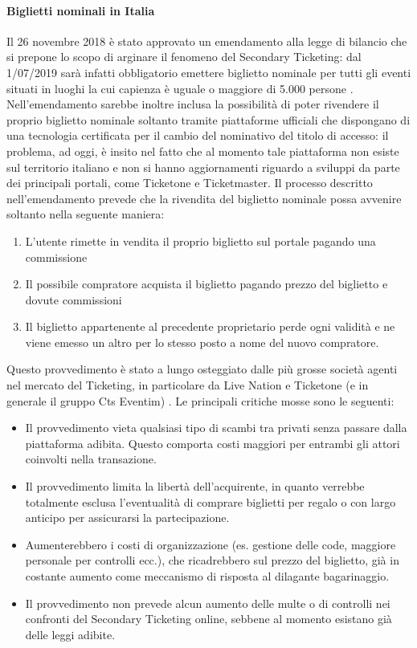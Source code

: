 \paragraph{Biglietti nominali in Italia}
Il 26 novembre 2018 è stato approvato un emendamento alla legge di bilancio che si prepone lo scopo di arginare il fenomeno del Secondary Ticketing: dal 1/07/2019 sarà infatti obbligatorio emettere biglietto nominale per tutti gli eventi situati in luoghi la cui capienza è uguale o maggiore di 5.000 persone \cite{larepbag}. Nell'emendamento sarebbe inoltre inclusa la possibilità di poter rivendere il proprio biglietto nominale soltanto tramite piattaforme ufficiali che dispongano di una tecnologia certificata per il cambio del nominativo del titolo di accesso: il problema, ad oggi, è insito nel fatto che al momento tale piattaforma non esiste sul territorio italiano e non si hanno aggiornamenti riguardo a sviluppi da parte dei principali portali, come Ticketone e Ticketmaster.
Il processo descritto nell'emendamento prevede che la rivendita del biglietto nominale possa avvenire soltanto nella seguente maniera: 
\begin{enumerate}
\item L'utente rimette in vendita il proprio biglietto sul portale pagando una commissione
\item Il possibile compratore acquista il biglietto pagando prezzo del biglietto e dovute commissioni
\item Il biglietto appartenente al precedente proprietario perde ogni validità e ne viene emesso un altro per lo stesso posto a nome del nuovo compratore. 
\end{enumerate}   
Questo provvedimento è stato a lungo osteggiato dalle più grosse società agenti nel mercato del Ticketing, in particolare da Live Nation e Ticketone (e in generale il gruppo Cts Eventim) \cite{solebag}. Le principali critiche mosse sono le seguenti: 
\begin{itemize}
\item Il provvedimento vieta qualsiasi tipo di scambi tra privati senza passare dalla piattaforma adibita. Questo comporta costi maggiori per entrambi gli attori coinvolti nella transazione. 
\item Il provvedimento limita la libertà dell'acquirente, in quanto verrebbe totalmente esclusa l'eventualità di comprare biglietti per regalo o con largo anticipo per assicurarsi la partecipazione.
\item Aumenterebbero i costi di organizzazione (es. gestione delle code, maggiore personale per controlli ecc.), che ricadrebbero sul prezzo del biglietto, già in costante aumento come meccanismo di risposta al dilagante bagarinaggio. 
\item Il provvedimento non prevede alcun aumento delle multe o di controlli nei confronti del Secondary Ticketing online, sebbene al momento esistano già delle leggi adibite. 
\end{itemize}

